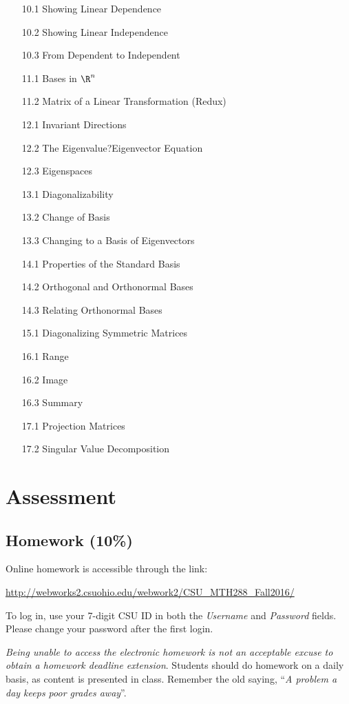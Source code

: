 \documentclass[11pt]{article}
\begin{document}
\begin{itemize}
\item[10.1] Showing Linear Dependence
\item[10.2] Showing Linear Independence
\item[10.3] From Dependent to Independent
\item[11.1] Bases in $\R^n$
\item[11.2] Matrix of a Linear Transformation (Redux)
\item[12.1] Invariant Directions
\item[12.2] The Eigenvalue?Eigenvector Equation
\item[12.3] Eigenspaces
\item[13.1] Diagonalizability
\item[13.2] Change of Basis
\item[13.3] Changing to a Basis of Eigenvectors	
\item[14.1] Properties of the Standard Basis
\item[14.2] Orthogonal and Orthonormal Bases
\item[14.3] Relating Orthonormal Bases
\item[15.1] Diagonalizing Symmetric Matrices
\item[16.1] Range
\item[16.2] Image
\item[16.3] Summary
\item[17.1] Projection Matrices
\item[17.2] Singular Value Decomposition
\end{itemize}

\section{Assessment}

\subsection{Homework (10\%)}
Online homework is accessible through the link:

\begin{center}
\url{http://webworks2.csuohio.edu/webwork2/CSU_MTH288_Fall2016/}
\end{center}

To log in, use your 7-digit CSU ID in both the  \emph{Username} and \emph{Password} fields. Please change your password after the first login.

\emph{Being unable to access the electronic homework is not an acceptable excuse to obtain a homework deadline extension}. Students should do homework on a daily basis, as content is presented in class. Remember the old saying, ``\emph{A problem a day keeps poor grades away}''.
\end{document}
